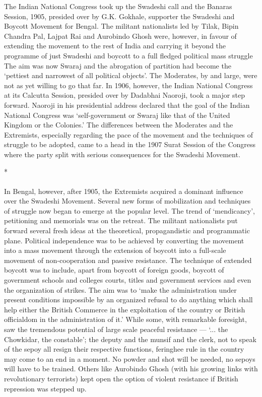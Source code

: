 The Indian National Congress took up the Swadeshi call and the Banaras Session, 1905, presided over by G.K. Gokhale, supporter the Swadeshi and Boycott Movement for Bengal. The militant nationalists led by Tilak, Bipin Chandra Pal, Lajpat Rai and Aurobindo Ghosh were, however, in favour of extending the movement to the rest of India and carrying it beyond the programme of just Swadeshi and boycott to a full fledged political mass struggle The aim was now Swaraj and the abrogation of partition had become the `pettiest and narrowest of all political objects'. The Moderates, by and large, were not as yet willing to go that far. In 1906, however, the Indian National Congress at its Calcutta Session, presided over by Dadabhai Naoroji, took a major step forward. Naoroji in his presidential address declared that the goal of the Indian National Congress was `self-government or Swaraj like that of the United Kingdom or the Colonies.' The differences between the Moderates and the Extremists, especially regarding the pace of the movement and the techniques of struggle to be adopted, came to a head in the 1907 Surat Session of the Congress where the party split with serious consequences for the Swadeshi Movement.

\begin{center}*\end{center}

\paragraph*{}

In Bengal, however, after 1905, the Extremists acquired a dominant influence over the Swadeshi Movement. Several new forms of mobilization and techniques of struggle now began to emerge at the popular level. The trend of `mendicancy', petitioning and memorials was on the retreat. The militant nationalists put forward several fresh ideas at the theoretical, propagandistic and programmatic plane. Political independence was to be achieved by converting the movement into a mass movement through the extension of boycott into a full-scale movement of non-cooperation and passive resistance. The technique of extended boycott was to include, apart from boycott of foreign goods, boycott of government schools and colleges courts, titles and government services and even the organization of strikes. The aim was to `make the administration under present conditions impossible by an organized refusal to do anything which shall help either the British Commerce in the exploitation of the country or British officialdom in the administration of it.' While some, with remarkable foresight, saw the tremendous potential of large scale peaceful resistance --- `... the Chowkidar, the constable'; the deputy and the munsif and the clerk, not to speak of the sepoy all resign their respective functions, feringhee rule in the country may come to an end in a moment. No powder and shot will be needed, no sepoys will have to be trained. Others like Aurobindo Ghosh (with his growing links with revolutionary terrorists) kept open the option of violent resistance if British repression was stepped up.

